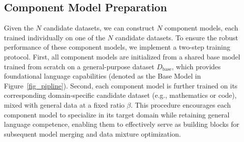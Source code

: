 \documentclass{article}
\theoremstyle{plain}
\theoremstyle{definition}
\theoremstyle{remark}
\begin{document}
\subsection{Component Model Preparation}
\label{3.2}
Given the $N$ candidate datasets, we can construct $N$ component models, each trained individually on one of the $N$ candidate datasets. To ensure the robust performance of these component models, we implement a two-step training protocol. First, all component models are initialized from a shared base model trained from scratch on a general-purpose dataset $D_{\text{base}}$, which provides foundational language capabilities (denoted as the Base Model in Figure~\ref{fig_pipline}). Second, each component model is further trained on its corresponding domain-specific candidate dataset (e.g., mathematics or code), mixed with general data at a fixed ratio $\beta$. This procedure encourages each component model to specialize in its target domain while retaining general language competence, enabling them to effectively serve as building blocks for subsequent model merging and data mixture optimization.




\end{document}
